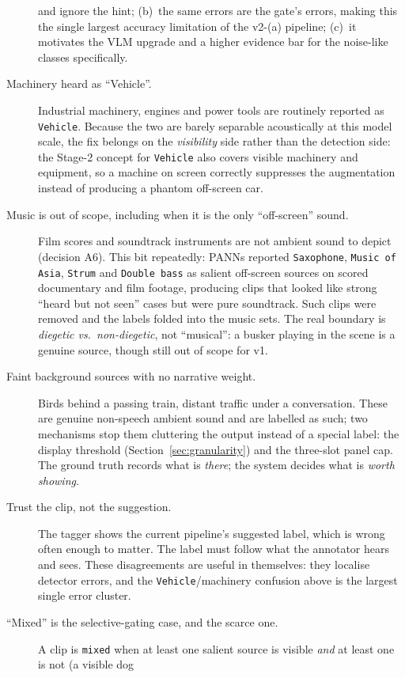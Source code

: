 \documentclass[11pt,a4paper]{article}
\begin{document}
\begin{description}
    and ignore the hint; (b)~the same errors are the gate's errors, making this the single
    largest accuracy limitation of the v2-(a) pipeline; (c)~it motivates the VLM upgrade and a
    higher evidence bar for the noise-like classes specifically.
  \item[Machinery heard as ``Vehicle''.] Industrial machinery, engines and power tools are
    routinely reported as \texttt{Vehicle}. Because the two are barely separable acoustically at
    this model scale, the fix belongs on the \emph{visibility} side rather than the detection
    side: the Stage-2 concept for \texttt{Vehicle} also covers visible machinery and equipment,
    so a machine on screen correctly suppresses the augmentation instead of producing a phantom
    off-screen car.
  \item[Music is out of scope, including when it is the only ``off-screen'' sound.] Film scores
    and soundtrack instruments are not ambient sound to depict (decision A6). This bit
    repeatedly: PANNs reported \texttt{Saxophone}, \texttt{Music of Asia}, \texttt{Strum} and
    \texttt{Double bass} as salient off-screen sources on scored documentary and film footage,
    producing clips that looked like strong ``heard but not seen'' cases but were pure
    soundtrack. Such clips were removed and the labels folded into the music sets. The real
    boundary is \emph{diegetic vs.\ non-diegetic}, not ``musical'': a busker playing in the scene
    is a genuine source, though still out of scope for v1.
  \item[Faint background sources with no narrative weight.] Birds behind a passing train,
    distant traffic under a conversation. These are genuine non-speech ambient sound and are
    labelled as such; two mechanisms stop them cluttering the output instead of a special label:
    the display threshold (Section~\ref{sec:granularity}) and the three-slot panel cap. The
    ground truth records what is \emph{there}; the system decides what is \emph{worth showing}.
  \item[Trust the clip, not the suggestion.] The tagger shows the current pipeline's suggested
    label, which is wrong often enough to matter. The label must follow what the annotator hears
    and sees. These disagreements are useful in themselves: they localise detector errors, and
    the \texttt{Vehicle}/machinery confusion above is the largest single error cluster.
  \item[``Mixed'' is the selective-gating case, and the scarce one.] A clip is \texttt{mixed}
    when at least one salient source is visible \emph{and} at least one is not (a visible dog

\end{description}
\end{document}
